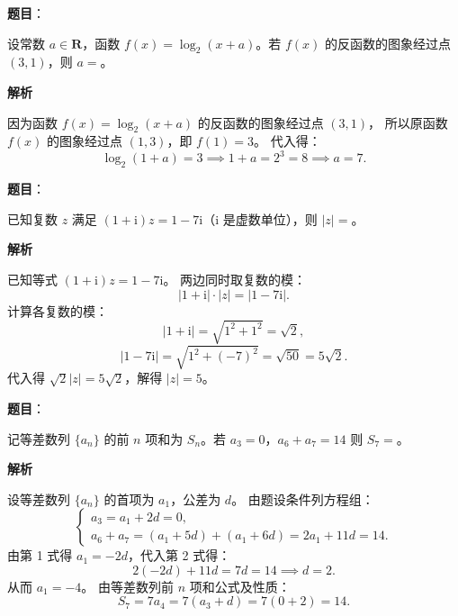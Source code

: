 \begin{answer}

\textbf{题目}：

设常数 $a \in \mathbf{R}$，函数 $f(x) = \log_2 (x + a)$。若 $f(x)$ 的反函数的图象经过点 $(3, 1)$，则 $a =$\gkblank{}。

\textbf{解析}

因为函数 $f(x) = \log_2 (x + a)$ 的反函数的图象经过点 $(3, 1)$，
所以原函数 $f(x)$ 的图象经过点 $(1, 3)$，即 $f(1) = 3$。
代入得：
\nopagebreak[4]
\[\log_2 (1 + a) = 3 \implies 1 + a = 2^3 = 8 \implies a = 7.\]


\end{answer}
\begin{answer}

\textbf{题目}：

已知复数 $z$ 满足 $(1 + \mathrm{i}) z = 1 - 7\mathrm{i}$（$\mathrm{i}$ 是虚数单位），则 $|z| =$\gkblank{}。

\textbf{解析}

已知等式 $(1 + \mathrm{i}) z = 1 - 7\mathrm{i}$。
两边同时取复数的模：
\nopagebreak[4]
\[|1 + \mathrm{i}| \cdot |z| = |1 - 7\mathrm{i}|.\]
计算各复数的模：
\nopagebreak[4]
\[|1 + \mathrm{i}| = \sqrt{1^2 + 1^2} = \sqrt{2},\]
\nopagebreak[4]
\[|1 - 7\mathrm{i}| = \sqrt{1^2 + (-7)^2} = \sqrt{50} = 5\sqrt{2}.\]
代入得 $\sqrt{2} |z| = 5\sqrt{2}$，解得 $|z| = 5$。


\end{answer}
\begin{answer}

\textbf{题目}：

记等差数列 $\{a_n\}$ 的前 $n$ 项和为 $S_n$。若 $a_3 = 0$，$a_6 + a_7 = 14$ 则 $S_7 =$\gkblank{}。

\textbf{解析}

设等差数列 $\{a_n\}$ 的首项为 $a_1$，公差为 $d$。
由题设条件列方程组：
\nopagebreak[4]
\[\begin{cases} a_3 = a_1 + 2d = 0, \\ a_6 + a_7 = (a_1 + 5d) + (a_1 + 6d) = 2a_1 + 11d = 14. \end{cases}\]
由第 1 式得 $a_1 = -2d$，代入第 2 式得：
\nopagebreak[4]
\[2(-2d) + 11d = 7d = 14 \implies d = 2.\]
从而 $a_1 = -4$。
由等差数列前 $n$ 项和公式及性质：
\nopagebreak[4]
\[S_7 = 7a_4 = 7(a_3 + d) = 7(0 + 2) = 14.\]


\end{answer}
